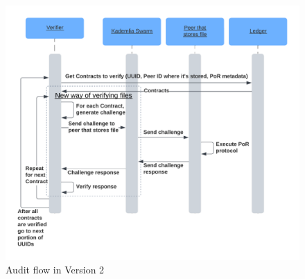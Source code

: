 \begin{figure}
    \centering
    \includegraphics[width=1\textwidth]{gfx/verify-procedure-v2.png}
    \caption{Audit flow in Version 2}
    \label{fig:verify-procedure-v2}
\end{figure}
